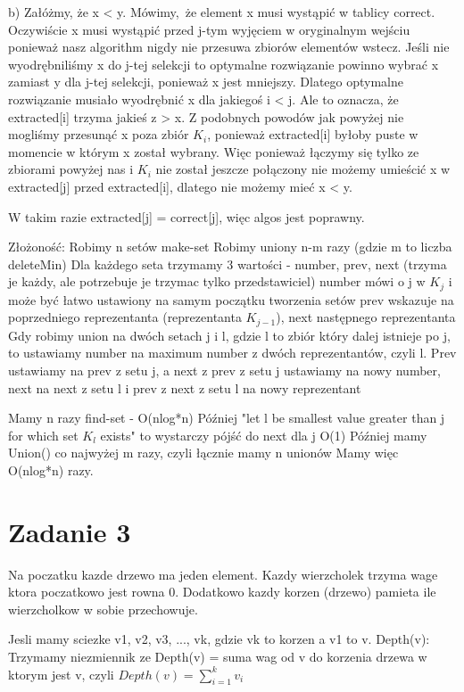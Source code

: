 \documentclass[12pt]{article}
\begin{document}
b) Załóżmy, że x < y. Mówimy, że element x musi wystąpić w tablicy correct. Oczywiście x musi wystąpić przed j-tym wyjęciem w oryginalnym wejściu ponieważ nasz algorithm nigdy nie przesuwa zbiorów elementów wstecz. Jeśli nie wyodrębniliśmy x do j-tej selekcji to optymalne rozwiązanie powinno wybrać x zamiast y dla j-tej selekcji, ponieważ x jest mniejszy. Dlatego optymalne rozwiązanie musiało wyodrębnić x dla jakiegoś i < j. Ale to oznacza, że extracted[i] trzyma jakieś z > x. Z podobnych powodów jak powyżej nie mogliśmy przesunąć x poza zbiór $K_i$, ponieważ extracted[i] byłoby puste w momencie w którym x został wybrany. Więc ponieważ łączymy się tylko ze zbiorami powyżej nas i $K_i$ nie został jeszcze połączony nie możemy umieścić x w extracted[j] przed extracted[i], dlatego nie możemy mieć x < y.

W takim razie extracted[j] = correct[j], więc algos jest poprawny.


Złożoność:
Robimy n setów make-set 
Robimy uniony n-m razy (gdzie m to liczba deleteMin)
Dla każdego seta trzymamy 3 wartości - number, prev, next (trzyma je każdy, ale potrzebuje je trzymac tylko przedstawiciel)
number mówi o j w $K_j$ i może być łatwo ustawiony na samym początku tworzenia setów
prev wskazuje na poprzedniego reprezentanta (reprezentanta $K_{j-1}$), next następnego reprezentanta
Gdy robimy union na dwóch setach j i l, gdzie l to zbiór który dalej istnieje po j, to ustawiamy number na maximum number z dwóch reprezentantów, czyli l. Prev ustawiamy na prev z setu j, a next z prev z setu j ustawiamy na nowy number, next na next z setu l i prev z next z setu l na nowy reprezentant

Mamy n razy find-set - O(nlog*n)
Później "let l be smallest value greater than j for which set $K_l$ exists" to wystarczy pójść do next dla j O(1)
Później mamy Union() co najwyżej m razy, czyli łącznie mamy n unionów
Mamy więc O(nlog*n) razy.



\section{Zadanie 3}
Na poczatku kazde drzewo ma jeden element. Kazdy wierzcholek trzyma wage ktora poczatkowo jest rowna 0.
Dodatkowo kazdy korzen (drzewo) pamieta ile wierzcholkow w sobie przechowuje.

Jesli mamy sciezke v1, v2, v3, ..., vk, gdzie vk to korzen a v1 to v.
Depth(v):
Trzymamy niezmiennik ze Depth(v) = suma wag od v do korzenia drzewa w ktorym jest v, czyli $Depth(v) = \sum_{i=1}^{k} v_i$
\end{document}
